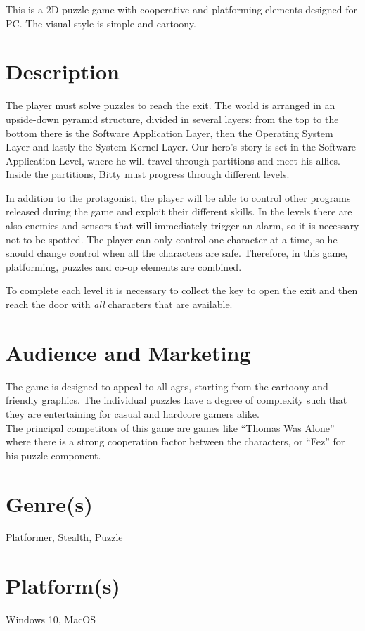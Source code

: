 \documentclass[12pt, a4paper]{report}
\begin{document}
This is a 2D puzzle game with cooperative and platforming elements designed for PC. The visual style is simple and cartoony.

\section*{Description}
The player must solve puzzles to reach the exit. The world is arranged in an upside-down pyramid structure, divided in several layers: from the top to the bottom there is the Software Application Layer, then the Operating System Layer and lastly the System Kernel Layer. Our hero’s story is set in the Software Application Level, where he will travel through partitions and meet his allies. Inside the partitions, Bitty must progress through different levels.

In addition to the protagonist, the player will be able to control other programs released during the game and exploit their different skills. In the levels there are also enemies and sensors that will immediately trigger an alarm, so it is necessary not to be spotted. The player can only control one character at a time, so he should change control when all the characters are safe. Therefore, in this game, platforming, puzzles and co-op elements are combined.

To complete each level it is necessary to collect the key to open the exit and then reach the door with \textit{all} characters that are available.

\section*{Audience and Marketing}
The game is designed to appeal to all ages, starting from the cartoony and friendly graphics. The individual puzzles have a degree of complexity such that they are entertaining for casual and hardcore gamers alike.\\
The principal competitors of this game are games like “Thomas Was Alone” where there is a strong cooperation factor between the characters, or “Fez” for his puzzle component.

\section*{Genre(s)}
Platformer, Stealth, Puzzle
\section*{Platform(s)}
Windows 10, MacOS
\end{document}
